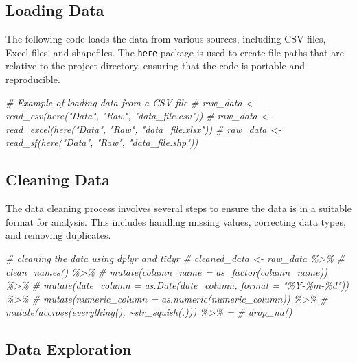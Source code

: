 \documentclass[
  12pt,
]{article}
\newenvironment{Shaded}{\begin{snugshade}}{\end{snugshade}}
\newcommand{\CommentTok}[1]{\textcolor[rgb]{0.56,0.35,0.01}{\textit{#1}}}
\begin{document}
\subsection{Loading Data}\label{loading-data}

The following code loads the data from various sources, including CSV
files, Excel files, and shapefiles. The \texttt{here} package is used to
create file paths that are relative to the project directory, ensuring
that the code is portable and reproducible.

\begin{Shaded}
\begin{Highlighting}[]
\CommentTok{\# Example of loading data from a CSV file}
\CommentTok{\# raw\_data \textless{}{-} read\_csv(here("Data", "Raw", "data\_file.csv"))}
\CommentTok{\# raw\_data \textless{}{-} read\_excel(here("Data", "Raw", "data\_file.xlsx"))}
\CommentTok{\# raw\_data \textless{}{-} read\_sf(here("Data", "Raw", "data\_file.shp"))}
\end{Highlighting}
\end{Shaded}

\subsection{Cleaning Data}\label{cleaning-data}

The data cleaning process involves several steps to ensure the data is
in a suitable format for analysis. This includes handling missing
values, correcting data types, and removing duplicates.

\begin{Shaded}
\begin{Highlighting}[]
\CommentTok{\# cleaning the data using dplyr and tidyr}
\CommentTok{\# cleaned\_data \textless{}{-} raw\_data \%\textgreater{}\%}
\CommentTok{\#   clean\_names() \%\textgreater{}\%}
\CommentTok{\#   mutate(column\_name = as\_factor(column\_name)) \%\textgreater{}\%}
\CommentTok{\#   mutate(date\_column = as.Date(date\_column, format = "\%Y{-}\%m{-}\%d")) \%\textgreater{}\%}
\CommentTok{\#   mutate(numeric\_column = as.numeric(numeric\_column)) \%\textgreater{}\%}
\CommentTok{\#   mutate(accross(everything(), \textasciitilde{}str\_squish(.))) \%\textgreater{}\% =}
\CommentTok{\#   drop\_na()}
\end{Highlighting}
\end{Shaded}

\subsection{Data Exploration}\label{data-exploration}
\end{document}
